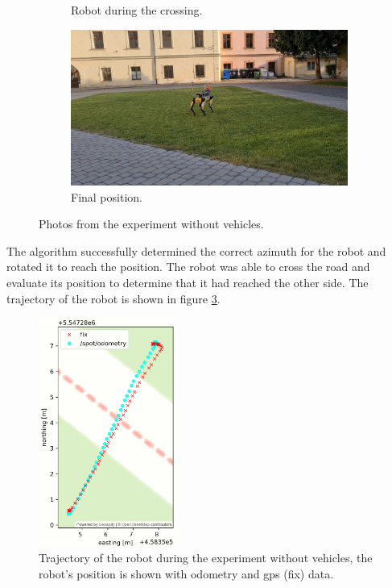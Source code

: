 \begin{figure}[ht]
\begin{subfigure}{0.49\textwidth}
                    \caption{Robot during the crossing.}
                \end{subfigure}
                \begin{subfigure}{0.49\textwidth}
                    \includegraphics[width=\textwidth]{images/final1.jpg}
                    \caption{Final position.}
                    \label{fig:final1}
                \end{subfigure}
                \caption{Photos from the experiment without vehicles.}
            \end{figure}
            The algorithm successfully determined the correct azimuth for the robot and rotated it to reach the position. The robot was able to cross the road and evaluate its position to determine that it had reached the other side. The trajectory of the robot is shown in figure \ref{fig:trajectory1}.
            \begin{figure}[H]
                \centering
                \includegraphics[height=7.5cm]{images/real_trajectory.png}
                \caption{Trajectory of the robot during the experiment without vehicles, the robot's position is shown with odometry and gps (fix) data.}
                \label{fig:trajectory1}
            \end{figure}


